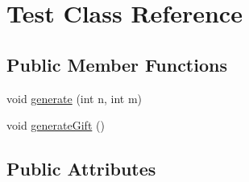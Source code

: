 \hypertarget{class_test}{}\section{Test Class Reference}
\label{class_test}
\subsection*{Public Member Functions}
\begin{DoxyCompactItemize}
\item 
void \hyperlink{class_test_a50c205176816eab64b513c29a20072a5}{generate} (int n, int m)
\item 
void \hyperlink{class_test_a1821f9199e4fba5d3781ed46fd914aed}{generate\+Gift} ()
\end{DoxyCompactItemize}
\subsection*{Public Attributes}
